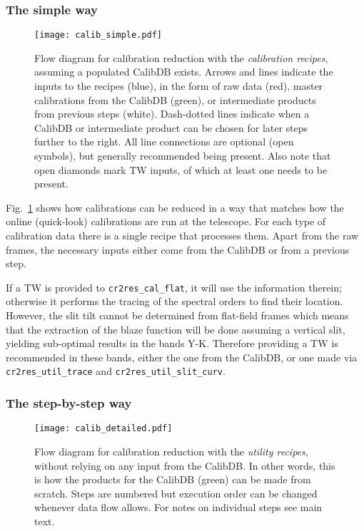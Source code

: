 \subsubsection{The simple way}
\label{sec:simplecalib}
\begin{figure}[!tb]
    \begin{center}
        \texttt{[image: calib\_simple.pdf]}
    \end{center}
    \caption{
        \label{fig:calibflow_simple}
        Flow diagram for calibration reduction with the \textit{calibration
        recipes}, assuming a populated CalibDB exists. Arrows and lines indicate
        the inputs to the recipes (blue), in the form of raw data (red), master
        calibrations from the CalibDB (green), or intermediate products from
        previous steps (white). Dash-dotted lines indicate when a CalibDB or
        intermediate product can be chosen for later steps further to the right.
        All line connections are optional (open symbols), but generally
        recommended being present. Also note that open diamonds mark TW inputs,
        of which at least one needs to be present.
    }
\end{figure}

Fig.~\ref{fig:calibflow_simple} shows how calibrations can be reduced in a way
that matches how the online (quick-look) calibrations are run at the telescope.
For each type of calibration data there is a single recipe that processes them.
Apart from the raw frames, the necessary inputs either come from the CalibDB or from a previous step.


If a TW is provided to \texttt{cr2res\_cal\_flat}, it will use the information
therein; otherwise it performs the tracing of the spectral orders to find their
location. However, the slit tilt cannot be determined from flat-field frames
which means that the extraction of the blaze function will be done assuming a
vertical slit, yielding sub-optimal results in the bands Y-K. Therefore
providing a TW is recommended in these bands, either the one from the CalibDB,
or one made via \texttt{cr2res\_util\_trace} and
\texttt{cr2res\_util\_slit\_curv}.


\subsubsection{The step-by-step way}
\label{sec:stepcalib}

\begin{figure}[!tb]
    \begin{center}
        \texttt{[image: calib\_detailed.pdf]}
    \end{center}
    \caption{
        \label{fig:calibflow_detailed}
        Flow diagram for calibration reduction with the \textit{utility
            recipes},
        without relying on any input from the CalibDB. In other words, this is
        how the products for the CalibDB (green) can be made from scratch.
        Steps
        are
        numbered but execution order can be changed whenever data flow allows.
        For
        notes on individual steps see main text.
    }
\end{figure}

